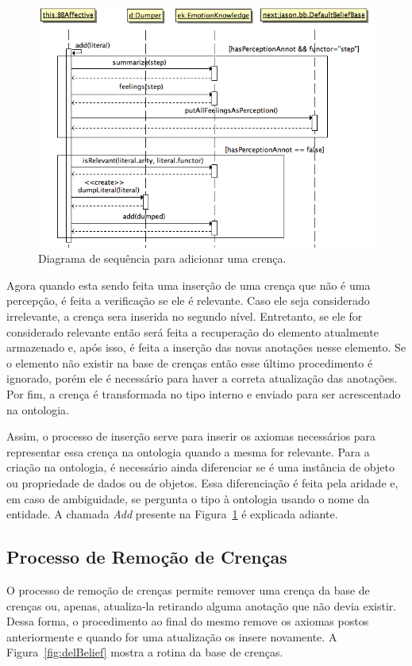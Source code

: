 \begin{figure}
  \centering
  \includegraphics[width=12cm]{figuras/addB.png}
  \caption{Diagrama de sequência para adicionar uma crença.}
  \label{fig:addBelief}
\end{figure}

Agora quando esta sendo feita uma inserção de uma crença que não é uma
percepção, é feita a verificação se ele é relevante. Caso ele seja considerado
irrelevante, a crença sera inserida no segundo nível. Entretanto, se ele for
considerado relevante então será feita a recuperação do elemento atualmente
armazenado e, após isso, é feita a inserção das novas anotações nesse
elemento. Se o elemento não existir na base de crenças então esse último
procedimento é ignorado, porém ele é necessário para haver a correta
atualização das anotações. Por fim, a crença é transformada no tipo interno e
enviado para ser acrescentado na ontologia.

Assim, o processo de inserção serve para inserir os axiomas necessários para
representar essa crença na ontologia quando a mesma for relevante. Para a
criação na ontologia, é necessário ainda diferenciar se é uma instância de
objeto ou propriedade de dados ou de objetos. Essa diferenciação é feita pela
aridade e, em caso de ambiguidade, se pergunta o tipo à ontologia usando o
nome da entidade. A chamada \emph{Add} presente na Figura~\ref{fig:addBelief}
é explicada adiante.

\vfill

\subsection{Processo de Remoção de Crenças}

O processo de remoção de crenças permite remover uma crença da base de crenças
ou, apenas, atualiza-la retirando alguma anotação que não devia existir. Dessa
forma, o procedimento ao final do mesmo remove os axiomas postos anteriormente
e quando for uma atualização os insere novamente. A Figura~\ref{fig:delBelief}
mostra a rotina da base de crenças.


